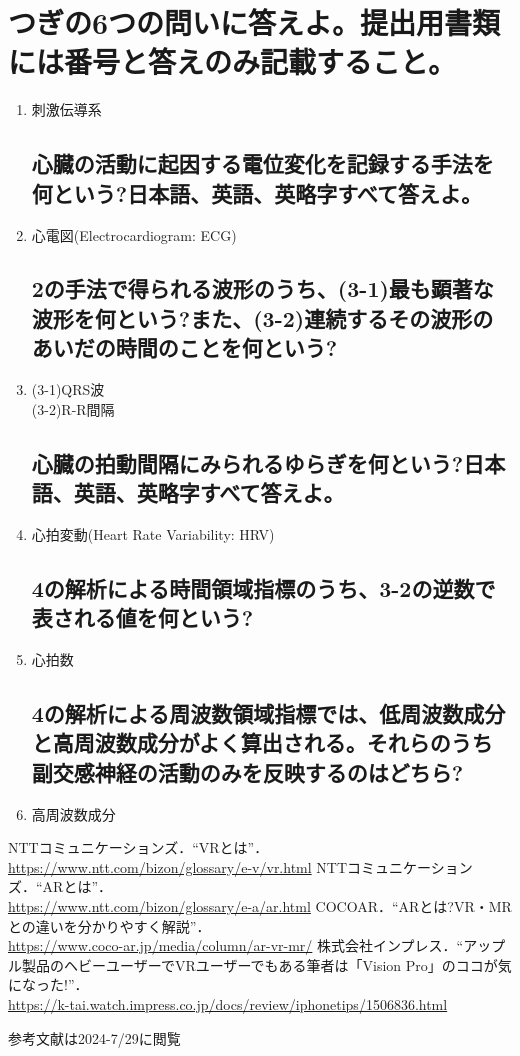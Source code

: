 \documentclass[titlepage,a4paper]{jsarticle}
\begin{document}
\section{つぎの6つの問いに答えよ。提出用書類には番号と答えのみ記載すること。}%
\begin{enumerate}
      \subsection{心臓全体が規則正しく一体となって収縮するよう調節する心筋線維を何という?}
      \item 刺激伝導系
            \subsection{心臓の活動に起因する電位変化を記録する手法を何という?日本語、英語、英略字すべて答えよ。}
      \item 心電図(Electrocardiogram: ECG)
            \subsection{2の手法で得られる波形のうち、(3-1)最も顕著な波形を何という?また、(3-2)連続するその波形のあいだの時間のことを何という?}
      \item (3-1)QRS波\\
            (3-2)R-R間隔
            \subsection{心臓の拍動間隔にみられるゆらぎを何という?日本語、英語、英略字すべて答えよ。}
      \item 心拍変動(Heart Rate Variability: HRV)
            \subsection{4の解析による時間領域指標のうち、3-2の逆数で表される値を何という?}
      \item 心拍数
            \subsection{4の解析による周波数領域指標では、低周波数成分と高周波数成分がよく算出される。それらのうち副交感神経の活動のみを反映するのはどちら?}
      \item 高周波数成分
\end{enumerate}
\begin{thebibliography}{99}
      NTTコミュニケーションズ．``VRとは''．\\
      \url{https://www.ntt.com/bizon/glossary/e-v/vr.html}
      NTTコミュニケーションズ．``ARとは''．\\
      \url{https://www.ntt.com/bizon/glossary/e-a/ar.html}
      COCOAR．``ARとは?VR・MRとの違いを分かりやすく解説''．\\
      \url{https://www.coco-ar.jp/media/column/ar-vr-mr/}
      株式会社インプレス．``アップル製品のヘビーユーザーでVRユーザーでもある筆者は「Vision Pro」のココが気になった!''．\\
      \url{https://k-tai.watch.impress.co.jp/docs/review/iphonetips/1506836.html}
\end{thebibliography}
参考文献は2024-7/29に閲覧
\end{document}
